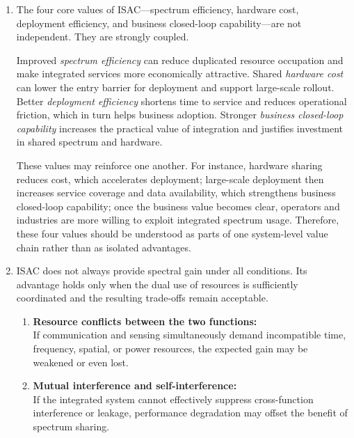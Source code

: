 \begin{enumerate}[label=\textbf{\arabic*.}, leftmargin=*]
    For large-scale emerging 6G scenarios, integrated deployment using ISAC is generally more suitable, especially when coverage, fast deployment, and service integration are important. However, standalone deployment may still be preferred in highly specialized scenarios where sensing requirements are extremely strict and difficult to satisfy on a shared platform.

    \item 
    The four core values of ISAC---spectrum efficiency, hardware cost, deployment efficiency, and business closed-loop capability---are not independent. They are strongly coupled.

    Improved \emph{spectrum efficiency} can reduce duplicated resource occupation and make integrated services more economically attractive. Shared \emph{hardware cost} can lower the entry barrier for deployment and support large-scale rollout. Better \emph{deployment efficiency} shortens time to service and reduces operational friction, which in turn helps business adoption. Stronger \emph{business closed-loop capability} increases the practical value of integration and justifies investment in shared spectrum and hardware.

    These values may reinforce one another. For instance, hardware sharing reduces cost, which accelerates deployment; large-scale deployment then increases service coverage and data availability, which strengthens business closed-loop capability; once the business value becomes clear, operators and industries are more willing to exploit integrated spectrum usage. Therefore, these four values should be understood as parts of one system-level value chain rather than as isolated advantages.

    \item 
    ISAC does not always provide spectral gain under all conditions. Its advantage holds only when the dual use of resources is sufficiently coordinated and the resulting trade-offs remain acceptable.

    \begin{enumerate}[label=(\alph*)]
        \item \textbf{Resource conflicts between the two functions:} \\
        If communication and sensing simultaneously demand incompatible time, frequency, spatial, or power resources, the expected gain may be weakened or even lost.

        \item \textbf{Mutual interference and self-interference:} \\
        If the integrated system cannot effectively suppress cross-function interference or leakage, performance degradation may offset the benefit of spectrum sharing.


\end{enumerate}
\end{enumerate}
